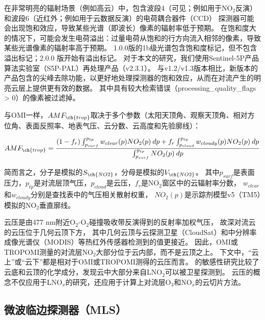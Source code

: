 在非常明亮的辐射场景（例如高云）中，包含波段4（可见；例如用于NO$_2$反演）和波段6（近红外；例如用于云数据反演）的电荷耦合器件（CCD） 探测器可能会出现饱和效应\citep{Ludewig.2020}，导致某些光谱（即波长）像素的辐射率低于预期。
在饱和度大的情况下，可能会发生电荷溢出：过量电荷从饱和的行方向流入相邻的像素，导致某些光谱像素的辐射率高于预期。
1.0.0版的1b级光谱包含饱和度标记，但不包含溢出标记；2.0.0 版开始有溢出标记\citep{Ludewig.2020}。
对于本文的研究，我们使用Sentinel-5P产品算法实验室（S5P-PAL）再处理产品（v2.3.1）。
与v1.2/v1.3版本相比，新版本的产品包含的尖峰去除功能，以更好地处理探测器的饱和效应，从而在对流产生的明亮云层上提供更有效的数据\citep{Ludewig.2020,VanGeffen.2022}。
其中具有较大检索错误（processing\_quality\_flags > 0）的像素被过滤掉。

与OMI一样，$AMF_{\ch{trop}}$取决于多个参数（太阳天顶角、观察天顶角、相对方位角、表面反照率、地表气压、云分数、云高度和先验廓线）：

\begin{equation} \label{eq:AMF_NO2}
AMF_{\ch{trop}} = \frac{(1-f_r) \int_{p_{surf}}^{p_{tp}} w_{clear}(p) NO_2(p) \: dp + f_r \int_{p_{cloud}}^{p_{tp}} w_{cloudy}(p) NO_2(p) \: dp}{\int_{p_{surf}}^{p_{tp}} NO_2(p) \: dp}
\end{equation}

简而言之，分子是模拟的$S_{\ch{NO2}}$，分母是模拟的$V_{\ch{NO2}}$。
其中$p_{surf}$是表面压力，$p_{tp}$是对流层顶气压，$p_{cloud}$是云压，$f_{r}$是NO$_2$窗区中的云辐射率分数，
$w_{clear}$和$w_{cloudy}$分别是查找表中的气压相关散射权重\citet{Lorente.2017}，
$NO_2(p)$是示踪剂模型v5（TM5）模拟的NO$_2$垂直廓线。

云压是由477 nm附近O$_2$-O$_2$碰撞吸收带反演得到的反射率加权气压\citep{Acarreta.2004,Sneep.2008,Stammes.2008}，
故深对流云的云压位于几何云顶下方，
其中几何云顶与云探测卫星（CloudSat）和中分辨率成像光谱仪（MODIS）等热红外传感器检测到的值更接近\citep{Vasilkov.2008,Joiner.2012}。
因此，OMI或TROPOMI测量的对流层NO$_2$大部分位于云内部，而不是云顶之上。
下文中，“云上”或“云下”都是相对于OMI或TROPOMI测得的云压而言。
\citet{Beirle.2009}的敏感性研究比较了云底和云顶的化学成分，发现云中大部分来自LNO$_2$可以被卫星探测到。
云压的概念不仅应用于LNO$_x$的研究，还应用于计算上对流层O$_3$和NO$_x$的云切片方法\citep{Ziemke.2009,Choi.2014,Strode.2017,Ziemke.2017,Marais.2018}。


\subsection{微波临边探测器（MLS）}

